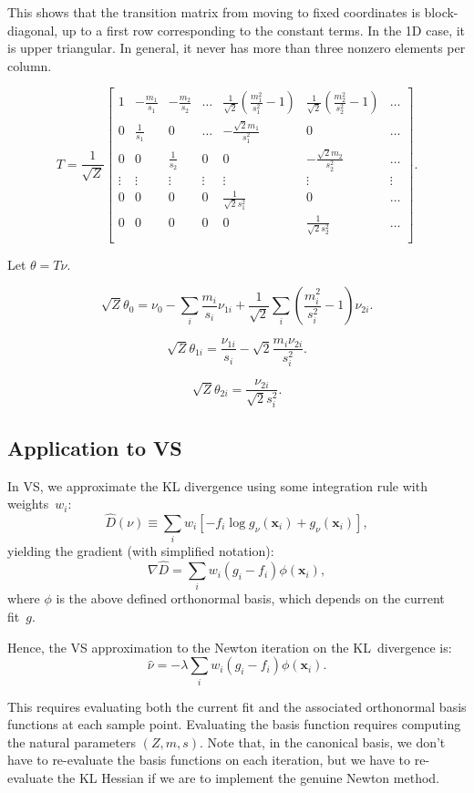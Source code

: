 \documentclass{article}
\def\x{\mathbf{x}}
\begin{document}
This shows that the transition matrix from moving to fixed coordinates is block-diagonal, up to a first row corresponding to the constant terms. In the 1D case, it is upper triangular. In general, it never has more than three nonzero elements per column.

$$
T =
\frac{1}{\sqrt{Z}}
\left[
\begin{array}{ccccccc}
1 & -\frac{m_1}{s_1} & -\frac{m_2}{s_2} & \ldots &
  \frac{1}{\sqrt{2}} \left(\frac{m_1^2}{s_1^2} - 1\right) &
  \frac{1}{\sqrt{2}} \left(\frac{m_2^2}{s_2^2} - 1\right) &
  \ldots \\
0 & \frac{1}{s_1} & 0 & \ldots &
-\frac{\sqrt{2}m_1}{s_1^2} & 0 & \ldots \\
  0 & 0 & \frac{1}{s_2} & 0 &
  0 & -\frac{\sqrt{2}m_2}{s_2^2} & \ldots \\
\vdots & \vdots & \vdots & \vdots &
\vdots & \vdots & \vdots\\
0 & 0 & 0 & 0 &
  \frac{1}{\sqrt{2}s_1^2} & 0 & \ldots\\
0 & 0 & 0 & 0 &
  0 & \frac{1}{\sqrt{2}s_2^2} & \ldots\\
\end{array}
\right].
$$

Let $\theta=T\nu$.

$$
\sqrt{Z}\theta_0 =
\nu_0
- \sum_i \frac{m_i}{s_i} \nu_{1i}
+ \frac{1}{\sqrt{2}} \sum_i \left(\frac{m_i^2}{s_i^2} - 1\right) \nu_{2i}
.
$$

$$
\sqrt{Z}\theta_{1i}
=
\frac{\nu_{1i}}{s_i} - \sqrt{2} \frac{m_i\nu_{2i}}{s_i^2}.
$$

$$
\sqrt{Z}\theta_{2i}
=
\frac{\nu_{2i}}{\sqrt{2}s_i^2}.
$$



\subsection{Application to VS}

In VS, we approximate the KL divergence using some integration rule with weights~$w_i$:
$$
\hat{D}(\nu)
\equiv \sum_i w_i \left[-f_i
  \log g_\nu(\x_i) + g_\nu(\x_i) \right],
$$
yielding the gradient (with simplified notation):
$$
\nabla\hat{D} =
\sum_i w_i (g_i - f_i) \phi(\x_i),
$$
where $\phi$ is the above defined orthonormal basis, which depends on the current fit~$g$.

Hence, the VS approximation to the Newton iteration on the KL~divergence is:
$$
\hat{\nu} = -\lambda \sum_i w_i (g_i - f_i) \phi(\x_i).
$$

This requires evaluating both the current fit and the associated orthonormal basis functions at each sample point. Evaluating the basis function requires computing the natural parameters $(Z, m, s)$. Note that, in the canonical basis, we don't have to re-evaluate the basis functions on each iteration, but we have to re-evaluate the KL Hessian if we are to implement the genuine Newton method.
\end{document}
